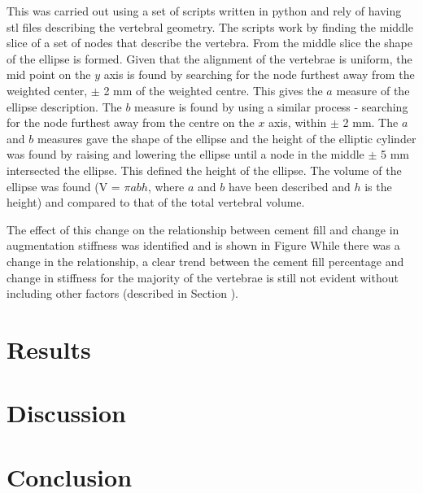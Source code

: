 This was carried out using a set of scripts written in python and rely of having stl files describing the vertebral geometry.
The scripts work by finding the middle slice of a set of nodes that describe the vertebra.
From the middle slice the shape of the ellipse is formed.
Given that the alignment of the vertebrae is uniform, the mid point on the $y$ axis is found by searching for the node furthest away from the weighted center, $\pm$ 2 mm of the weighted centre.
This gives the $a$ measure of the ellipse description.
The $b$ measure is found by using a similar process - searching for the node furthest away from the centre on the $x$ axis, within $\pm$ 2 mm.
The $a$ and $b$ measures gave the shape of the ellipse and the height of the elliptic cylinder was found by raising and lowering the ellipse until a node in the middle $\pm$ 5 mm intersected the ellipse.
This defined the height of the ellipse.
The volume of the ellipse was found (V = $\pi a b h$, where $a$ and $b$ have been described and $h$ is the height) and compared to that of the total vertebral volume. 

The effect of this change on the relationship between cement fill and change in augmentation stiffness was identified and is shown in Figure %
While there was a change in the relationship, a clear trend between the cement fill percentage and change in stiffness for the majority of the vertebrae is still not evident without including other factors (described in Section ).%

\section{Results}

\section{Discussion}

\section{Conclusion}







